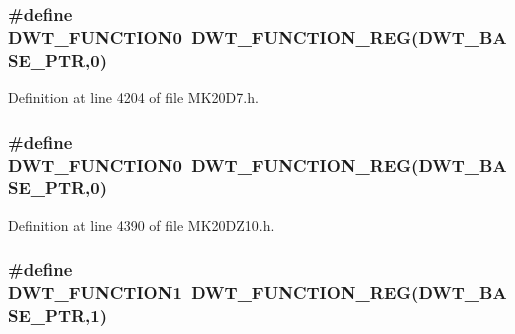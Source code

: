 \subsubsection[{\texorpdfstring{D\+W\+T\+\_\+\+F\+U\+N\+C\+T\+I\+O\+N0}{DWT_FUNCTION0}}]{\setlength{\rightskip}{0pt plus 5cm}\#define D\+W\+T\+\_\+\+F\+U\+N\+C\+T\+I\+O\+N0~{\bf D\+W\+T\+\_\+\+F\+U\+N\+C\+T\+I\+O\+N\+\_\+\+R\+EG}({\bf D\+W\+T\+\_\+\+B\+A\+S\+E\+\_\+\+P\+TR},0)}\hypertarget{group___d_w_t___register___accessor___macros_ga30eda8435a349787bc0ce7364059c42a}{}\label{group___d_w_t___register___accessor___macros_ga30eda8435a349787bc0ce7364059c42a}


Definition at line 4204 of file M\+K20\+D7.\+h.

\subsubsection[{\texorpdfstring{D\+W\+T\+\_\+\+F\+U\+N\+C\+T\+I\+O\+N0}{DWT_FUNCTION0}}]{\setlength{\rightskip}{0pt plus 5cm}\#define D\+W\+T\+\_\+\+F\+U\+N\+C\+T\+I\+O\+N0~{\bf D\+W\+T\+\_\+\+F\+U\+N\+C\+T\+I\+O\+N\+\_\+\+R\+EG}({\bf D\+W\+T\+\_\+\+B\+A\+S\+E\+\_\+\+P\+TR},0)}\hypertarget{group___d_w_t___register___accessor___macros_ga30eda8435a349787bc0ce7364059c42a}{}\label{group___d_w_t___register___accessor___macros_ga30eda8435a349787bc0ce7364059c42a}


Definition at line 4390 of file M\+K20\+D\+Z10.\+h.

\subsubsection[{\texorpdfstring{D\+W\+T\+\_\+\+F\+U\+N\+C\+T\+I\+O\+N1}{DWT_FUNCTION1}}]{\setlength{\rightskip}{0pt plus 5cm}\#define D\+W\+T\+\_\+\+F\+U\+N\+C\+T\+I\+O\+N1~{\bf D\+W\+T\+\_\+\+F\+U\+N\+C\+T\+I\+O\+N\+\_\+\+R\+EG}({\bf D\+W\+T\+\_\+\+B\+A\+S\+E\+\_\+\+P\+TR},1)}\hypertarget{group___d_w_t___register___accessor___macros_ga6e512f90919120ad3ecf145caafef873}{}\label{group___d_w_t___register___accessor___macros_ga6e512f90919120ad3ecf145caafef873}


